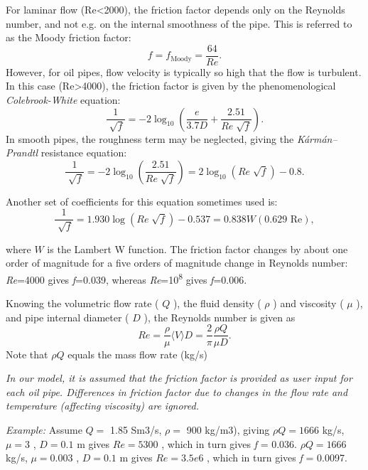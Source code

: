 \documentclass[12pt]{article}
\begin{document}
For laminar flow (Re<2000), the friction factor depends only on the Reynolds number, and not e.g. on the internal smoothness of the pipe. This is referred to as the Moody friction factor:
 \[ f=f_{\mathrm{Moody}}=\frac{64}{Re}. \] 
However, for oil pipes, flow velocity is typically so high that the flow is turbulent. In this case (Re>4000), the friction factor is given by the phenomenological \textit{Colebrook-White} equation:
 \[ \frac{1}{\sqrt[]{f}}=-2\log _{10} \left( \frac{e}{3.7D}+\frac{2.51}{Re\sqrt[]{f}} \right) . \] 
In smooth pipes, the roughness term may be neglected, giving the \textit{Kármán–Prandtl} resistance equation:
 \[ \frac{1}{\sqrt[]{f}}=-2\log _{10} \left( \frac{2.51}{Re\sqrt[]{f}} \right) =2\log _{10} \left( Re\sqrt[]{f} \right) -0.8. \] 


Another set of coefficients for this equation sometimes used is:
 \[ \frac{1}{\sqrt[]{f}}=1.930\log  \left( Re\sqrt[]{f} \right) -0.537=0.838 W \left( \text{0.629 Re} \right) , \] 


where  \( W \)  is the Lambert W function. The friction factor changes by about one order of magnitude for a five orders of magnitude change in Reynolds number: \textit{Re}=4000 gives \textit{f}=0.039, whereas \textit{Re}=10\textsuperscript{8} gives \textit{f}=0.006.


Knowing the volumetric flow rate ( \( Q \) ), the fluid density ( \(  \rho  \) ) and viscosity ( \(  \mu  \) ), and pipe internal diameter ( \( D \) ), the Reynolds number is given as
 \[ Re=\frac{ \rho }{ \mu } \langle V \rangle D=\frac{2}{ \pi }\frac{ \rho Q}{ \mu D}. \] 
Note that  \(  \rho Q \)  equals the mass flow rate (kg/s)


\medskip\noindent
\textit{In our model, it is assumed that the friction factor is provided as user input for each oil pipe. Differences in friction factor due to changes in the flow rate and temperature (affecting viscosity) are ignored.}


\textit{Example:}
Assume  \( Q= \) 1.85 Sm3/s,  \(  \rho = \) 900 kg/m3), giving \(  \rho Q=1666 \)  kg/s,  \(  \mu =3 \) ,  \( D=0.1 \)  m gives  \( Re=5300 \) , which in turn gives \textit{f} = 0.036.
 \(  \rho Q=1666 \)  kg/s,  \(  \mu =0.003 \) ,  \( D=0.1 \)  m gives  \( Re=3.5e6 \) , which in turn gives \textit{f} = 0.0097.
\end{document}
